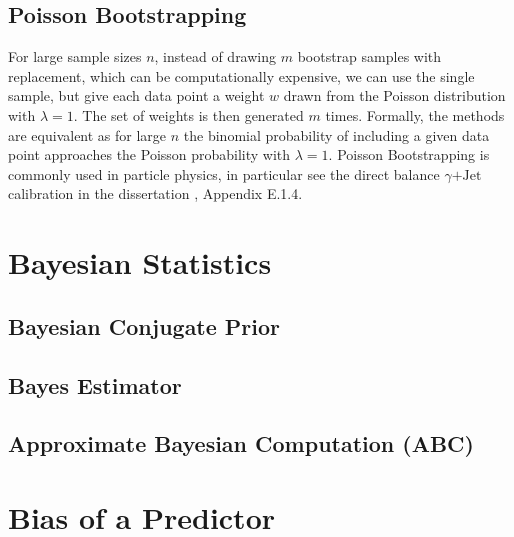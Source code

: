 \subsection{Poisson Bootstrapping}
\label{stats:bootstrapping:poisson}

For large sample sizes $n$, instead of drawing $m$ bootstrap samples with replacement,
which can be computationally expensive,
we can use the single sample,
but give each data point a weight $w$ drawn
from the Poisson distribution with $\lambda = 1$.
The set of weights is then generated $m$ times.
Formally, the methods are equivalent as for large $n$
the binomial probability of including a given data point approaches the Poisson probability with $\lambda = 1$.
Poisson Bootstrapping is commonly used in particle physics,
in particular see the direct balance $\gamma\text{+Jet}$ calibration
in the dissertation \cite{mepland_dissertation}, Appendix E.1.4.

\section{Bayesian Statistics}
\label{stats:Bayes}


\subsection{Bayesian Conjugate Prior}
\label{stats:Bayes:conjugate_prior}

\subsection{Bayes Estimator}
\label{stats:Bayes:estimator}

\subsection{Approximate Bayesian Computation (ABC)}
\label{stats:Bayes:ABC}

\section{Bias of a Predictor}
\label{stats:bias}

